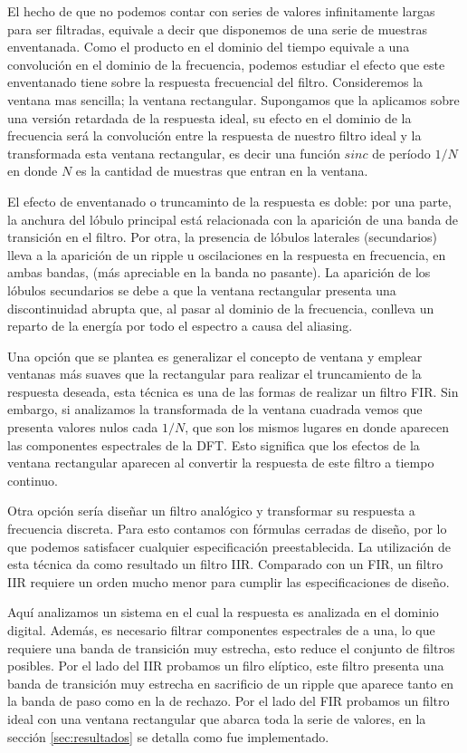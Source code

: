 El hecho de que no podemos contar con series de valores infinitamente largas para ser filtradas, equivale a decir que disponemos de una serie de muestras enventanada.
Como el producto en el dominio del tiempo equivale a una convolución en el dominio de la frecuencia, podemos estudiar el efecto que este enventanado tiene sobre la respuesta frecuencial del filtro.
Consideremos la ventana mas sencilla; la ventana rectangular. Supongamos que la aplicamos sobre una versión retardada de la respuesta ideal, su efecto en el dominio de la frecuencia será la convolución entre la respuesta de nuestro filtro ideal y la transformada esta ventana rectangular, es decir una función $sinc$ de período $1/N$ en donde $N$ es la cantidad de muestras que entran en la ventana.

El efecto de enventanado o truncaminto de la respuesta es doble: por una parte, la anchura del lóbulo principal está relacionada con la aparición de una banda de transición en el filtro. Por otra, la presencia de lóbulos laterales (secundarios) lleva a la aparición de un ripple u oscilaciones en la respuesta en frecuencia, en ambas bandas, (más apreciable en la banda no pasante).
La aparición de los lóbulos secundarios se debe a que la ventana rectangular presenta una discontinuidad abrupta que, al pasar al dominio de la frecuencia, conlleva un reparto de la energía por todo el espectro a causa del aliasing.

Una opción que se plantea es generalizar el concepto de ventana y emplear ventanas más suaves que la rectangular para realizar el truncamiento de la respuesta deseada, esta técnica es una de las formas de realizar un filtro FIR.
Sin embargo, si analizamos la transformada de la ventana cuadrada vemos que presenta valores nulos cada $1/N$, que son los mismos lugares en donde aparecen las componentes espectrales de la DFT. Esto significa que los efectos de la ventana rectangular aparecen al convertir la respuesta de este filtro a tiempo continuo.

Otra opción sería diseñar un filtro analógico y transformar su respuesta a frecuencia discreta. Para esto contamos con fórmulas cerradas de diseño, por lo que podemos satisfacer cualquier especificación preestablecida. La utilización de esta técnica da como resultado un filtro IIR. Comparado con un FIR, un filtro IIR requiere un orden mucho menor para cumplir las especificaciones de diseño.

Aquí analizamos un sistema en el cual la respuesta es analizada en el dominio digital. Además, es necesario filtrar componentes espectrales de a una, lo que requiere una banda de transición muy estrecha, esto reduce el conjunto de filtros posibles. Por el lado del IIR probamos un filro elíptico, este filtro presenta una banda de transición muy estrecha en sacrificio de un ripple que aparece tanto en la banda de paso como en la de rechazo. Por el lado del FIR probamos un filtro ideal con una ventana rectangular que abarca toda la serie de valores, en la sección \ref{sec:resultados} se detalla como fue implementado.

